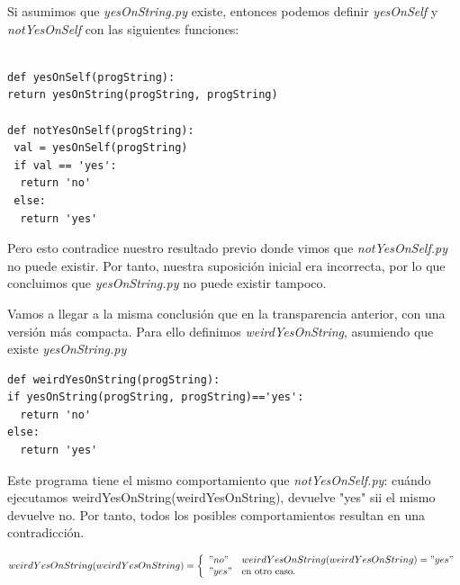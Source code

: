 \documentclass[xcolor=table]{beamer}
\begin{document}
\begin{frame}  [fragile] \scriptsize  

Si asumimos que \textit{yesOnString.py} existe, entonces podemos definir \textit{yesOnSelf} y \textit{notYesOnSelf} con las siguientes funciones:

 
 \begin{verbatim}

def yesOnSelf(progString):
return yesOnString(progString, progString)

def notYesOnSelf(progString):
 val = yesOnSelf(progString)
 if val == 'yes':
  return 'no'
 else:
  return 'yes'
\end{verbatim}    

Pero esto contradice nuestro resultado previo donde vimos que  \textit{notYesOnSelf.py} no puede existir. Por tanto, nuestra suposición inicial era incorrecta, por lo que concluimos que
\textit{yesOnString.py} no puede existir tampoco.

\end{frame} 

\begin{frame}  [fragile] \scriptsize  
Vamos a llegar a la misma conclusión que en la transparencia anterior, con una versión más compacta. Para ello definimos \textit{weirdYesOnString}, asumiendo que existe \textit{yesOnString.py}


 \begin{verbatim}
def weirdYesOnString(progString):
if yesOnString(progString, progString)=='yes':
  return 'no'
else:
  return 'yes'
\end{verbatim}    

Este programa tiene el mismo comportamiento que \textit{notYesOnSelf.py}: cuándo ejecutamos 
weirdYesOnString(weirdYesOnString), devuelve "yes" sii el mismo devuelve no. Por tanto, todos los posibles
comportamientos resultan en una contradicción.


\begin{dmath}
     \label{eq:weirdYesOnString}
     weirdYesOnString (weirdYesOnString) =  \left\{
	       \begin{array}{ll}
		 "no"      & weirdYesOnString (weirdYesOnString) = "yes" \\
		 "yes"     & \text{en otro caso.} \\
	       \end{array}
	     \right.
 \end{dmath}


\end{frame} 
\end{document}
